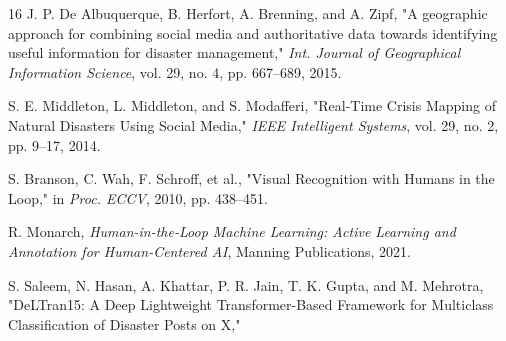 \documentclass[pdflatex,sn-mathphys-num]{sn-jnl}%
\theoremstyle{thmstyleone}%
\theoremstyle{thmstyletwo}%
\theoremstyle{thmstylethree}%
\begin{document}
\begin{thebibliography}{16}
J. P. De Albuquerque, B. Herfort, A. Brenning, and A. Zipf, "A geographic approach for combining social media and authoritative data towards identifying useful information for disaster management," \textit{Int. Journal of Geographical Information Science}, vol. 29, no. 4, pp. 667--689, 2015.

S. E. Middleton, L. Middleton, and S. Modafferi, "Real-Time Crisis Mapping of Natural Disasters Using Social Media," \textit{IEEE Intelligent Systems}, vol. 29, no. 2, pp. 9--17, 2014.

S. Branson, C. Wah, F. Schroff, et al., "Visual Recognition with Humans in the Loop," in \textit{Proc. ECCV}, 2010, pp. 438--451.

R. Monarch, \textit{Human-in-the-Loop Machine Learning: Active Learning and Annotation for Human-Centered AI}, Manning Publications, 2021.

S. Saleem, N. Hasan, A. Khattar, P. R. Jain, T. K. Gupta, and M. Mehrotra, 
"DeLTran15: A Deep Lightweight Transformer-Based Framework for Multiclass Classification of Disaster Posts on X," 
 

\end{thebibliography}
\end{document}
